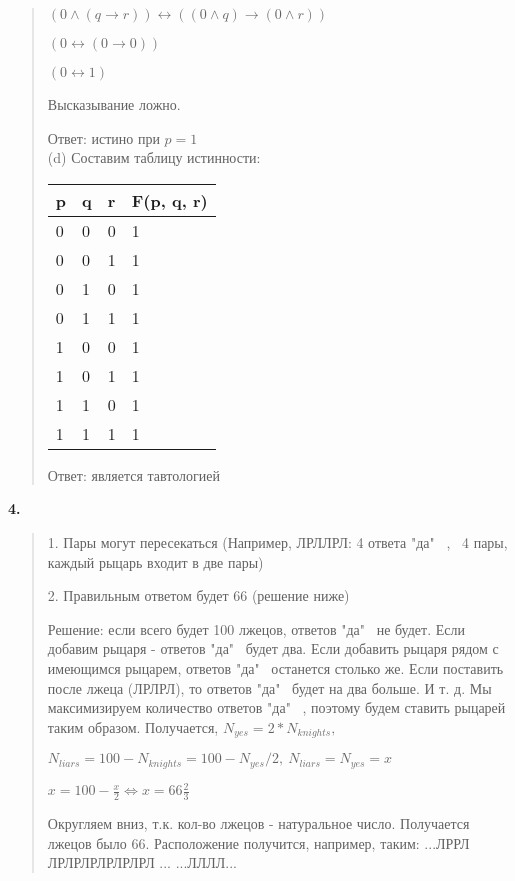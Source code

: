 \documentclass{article}
\begin{document}
\begin{quote}
\begin{center}
$(0 \land (q \rightarrow r)) \leftrightarrow 
((0 \land q) \rightarrow (0 \land r))$

$(0 \leftrightarrow (0 \rightarrow 0))$

$(0 \leftrightarrow 1)$
\end{center}

\hspace{0.5cm}
Высказывание ложно.

 Ответ: истино при $p = 1$\\

(d) Составим таблицу истинности:

\hspace{0.5cm}
\begin{tabular}{ m m m m }
    p & q & r & F(p, q, r) \\
\hline
0 & 0 & 0 & 1 \\
0 & 0 & 1 & 1 \\
0 & 1 & 0 & 1 \\
0 & 1 & 1 & 1 \\
1 & 0 & 0 & 1 \\
1 & 0 & 1 & 1 \\
1 & 1 & 0 & 1 \\
1 & 1 & 1 & 1 \\
\end{tabular}

Ответ: является тавтологией \\

\end{quote}

\textsf{\textbf{4.}}
\begin{quote}
\leftskip=0.2cm    
1. Пары могут пересекаться (Например, ЛРЛЛРЛ: 4 ответа "да" \ , \ 4 пары, каждый рыцарь входит в две пары)

2. Правильным ответом будет 66 (решение ниже)

Решение: если всего будет 100 лжецов, ответов "да" \ не будет. Если добавим рыцаря - ответов "да" \ 
будет два. Если добавить рыцаря рядом с имеющимся рыцарем, ответов "да" \ останется столько же.
Если поставить после лжеца (ЛРЛРЛ), то ответов "да" \ будет на два больше. И т. д. Мы максимизируем количество ответов "да" \ , поэтому будем ставить рыцарей таким образом.
Получается, $N_{yes} = 2 * N_{knights}, $

$N_{liars} = 100 - N_{knights} = 100 - N_{yes}/2, \ N_{liars} = N_{yes} = x$

$x = 100 - \frac{x}{2} \Longleftrightarrow x = 66 \frac{2}{3}$

Округляем вниз, т.к. кол-во лжецов - натуральное число. Получается лжецов было 66. Расположение получится, например, таким: ...ЛРРЛ ЛРЛРЛРЛРЛРЛРЛ ... ...ЛЛЛЛ...

\end{quote}
\end{document}
